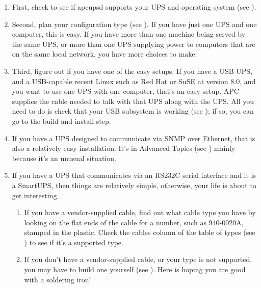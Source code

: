 \begin{enumerate}
\item First, check to see if apcupsd supports your UPS and operating system
(see 
).  
\item Second, plan your configuration type (see 
).  If you have just one UPS
and one computer, this is easy.  If you have more than one machine being
served by the same UPS, or more than one UPS supplying power to computers that
are on the same local network, you have more choices to make.  
\item Third, figure out if you have one of the easy setups.  If you have a USB
UPS, and a USB-capable recent Linux such as Red Hat or SuSE at version 8.0,
and you want to use one UPS with one computer, that's an easy setup.  APC
supplies the cable needed to talk with that UPS along with the UPS. All you
need to do is check that your USB subsystem is working (see 
); if so, you can go to
the build and install step.  
\item If you have a UPS designed to communicate via SNMP over Ethernet, that
is also a relatively easy installation. It's in Advanced Topics (see 
) mainly because it's an
unusual situation.  
\item If you have a UPS that communicates via an RS232C serial interface and
it is a SmartUPS, then things are relatively simple, otherwise, your life is
about to get interesting.  

\begin{enumerate}
\item If you have a vendor-supplied cable, find out what cable type you have
by looking on the flat ends of the cable for a number, such as 940-0020A,
stamped in the plastic.  Check the cables column of the table of types (see 
) to see if it's a supported
type.  
\item If you don't have a vendor-supplied cable, or your type is not
supported, you may have to build one yourself (see 
).  Here is hoping you are good with a
soldering iron!  
\end{enumerate}


\end{enumerate}

